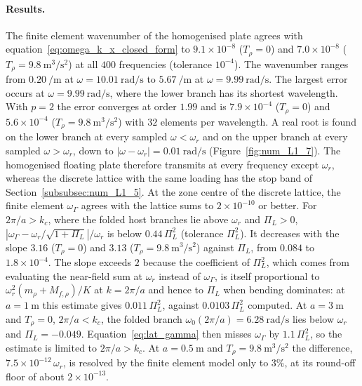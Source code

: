 {\paragraph{Results.} The finite element wavenumber of the homogenised plate agrees with equation~\eqref{eq:omega_k_x_closed_form} to $9.1\times10^{-8}$ ($T_\rho=0$) and $7.0\times10^{-8}$ ($T_\rho=9.8~\si{\meter\cubed\per\second\squared}$) at all $400$ frequencies (tolerance $10^{-4}$). The wavenumber ranges from $0.20~\si{\per\meter}$ at $\omega=10.01~\si{\radian\per\second}$ to $5.67~\si{\per\meter}$ at $\omega=9.99~\si{\radian\per\second}$. The largest error occurs at $\omega=9.99~\si{\radian\per\second}$, where the lower branch has its shortest wavelength. With $p=2$ the error converges at order $1.99$ and is $7.9\times10^{-4}$ ($T_\rho=0$) and $5.6\times10^{-4}$ ($T_\rho=9.8~\si{\meter\cubed\per\second\squared}$) with $32$ elements per wavelength. A real root is found on the lower branch at every sampled $\omega<\omega_r$ and on the upper branch at every sampled $\omega>\omega_r$, down to $|\omega-\omega_r|=0.01~\si{\radian\per\second}$ (Figure~\ref{fig:num_L1_7}). The homogenised floating plate therefore transmits at every frequency except $\omega_r$, whereas the discrete lattice with the same loading has the stop band of Section~\ref{subsubsec:num_L1_5}. At the zone centre of the discrete lattice, the finite element $\omega_\Gamma$ agrees with the lattice sums to $2\times10^{-10}$ or better. For $2\pi/a>k_c$, where the folded host branches lie above $\omega_r$ and $\Pi_L>0$, $|\omega_\Gamma-\omega_r/\sqrt{1+\Pi_L}|/\omega_r$ is below $0.44\,\Pi_L^2$ (tolerance $\Pi_L^2$). It decreases with the slope $3.16$ ($T_\rho=0$) and $3.13$ ($T_\rho=9.8~\si{\meter\cubed\per\second\squared}$) against $\Pi_L$, from $0.084$ to $1.8\times10^{-4}$. The slope exceeds $2$ because the coefficient of $\Pi_L^2$, which comes from evaluating the near-field sum at $\omega_r$ instead of $\omega_\Gamma$, is itself proportional to $\omega_r^2(m_\rho+M_{f,\rho})/K$ at $k=2\pi/a$ and hence to $\Pi_L$ when bending dominates: at $a=1~\si{\meter}$ this estimate gives $0.011\,\Pi_L^2$, against $0.0103\,\Pi_L^2$ computed. At $a=3~\si{\meter}$ and $T_\rho=0$, $2\pi/a<k_c$, the folded branch $\omega_0(2\pi/a)=6.28~\si{\radian\per\second}$ lies below $\omega_r$ and $\Pi_L=-0.049$. Equation~\eqref{eq:lat_gamma} then misses $\omega_\Gamma$ by $1.1\,\Pi_L^2$, so the estimate is limited to $2\pi/a>k_c$. At $a=0.5~\si{\meter}$ and $T_\rho=9.8~\si{\meter\cubed\per\second\squared}$ the difference, $7.5\times10^{-12}\,\omega_r$, is resolved by the finite element model only to $3\%$, at its round-off floor of about $2\times10^{-13}$.

}
